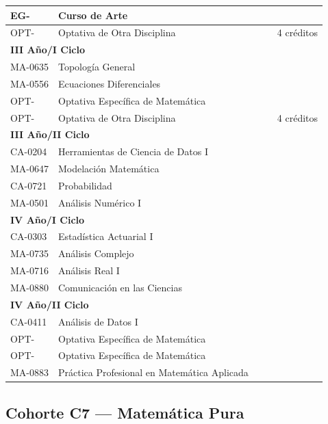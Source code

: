 \begin{longtable}{|p{2cm}|p{7cm}|p{1.6cm}|p{1.6cm}|p{2.8cm}|}
EG- & Curso de Arte &  &  &  \\ \hline
OPT- & Optativa de Otra Disciplina &  &  & 4 créditos \\ \hline
\multicolumn{5}{|l|}{\cellcolor[HTML]{E6E6E6}\textbf{III Año/I Ciclo}} \\ \hline
MA-0635 & Topología General &  &  &  \\ \hline
MA-0556 & Ecuaciones Diferenciales &  &  &  \\ \hline
OPT- & Optativa Específica de Matemática &  &  &  \\ \hline
OPT- & Optativa de Otra Disciplina &  &  & 4 créditos \\ \hline
\multicolumn{5}{|l|}{\cellcolor[HTML]{E6E6E6}\textbf{III Año/II Ciclo}} \\ \hline
CA-0204 & Herramientas de Ciencia de Datos I &  &  &  \\ \hline
MA-0647 & Modelación Matemática &  &  &  \\ \hline
CA-0721 & Probabilidad &  &  &  \\ \hline
MA-0501 & Análisis Numérico I &  &  &  \\ \hline
\multicolumn{5}{|l|}{\cellcolor[HTML]{E6E6E6}\textbf{IV Año/I Ciclo}} \\ \hline
CA-0303 & Estadística Actuarial I &  &  &  \\ \hline
MA-0735 & Análisis Complejo &  &  &  \\ \hline
MA-0716 & Análisis Real I &  &  &  \\ \hline
MA-0880 & Comunicación en las Ciencias &  &  &  \\ \hline
\multicolumn{5}{|l|}{\cellcolor[HTML]{E6E6E6}\textbf{IV Año/II Ciclo}} \\ \hline
CA-0411 & Análisis de Datos I &  &  &  \\ \hline
OPT- & Optativa Específica de Matemática &  &  &  \\ \hline
OPT- & Optativa Específica de Matemática &  &  &  \\ \hline
MA-0883 & Práctica Profesional en Matemática Aplicada &  &  &  \\ \hline
\end{longtable}

\subsection{Cohorte C7 --- Matemática Pura}
\label{anexo:estudioC7P}

